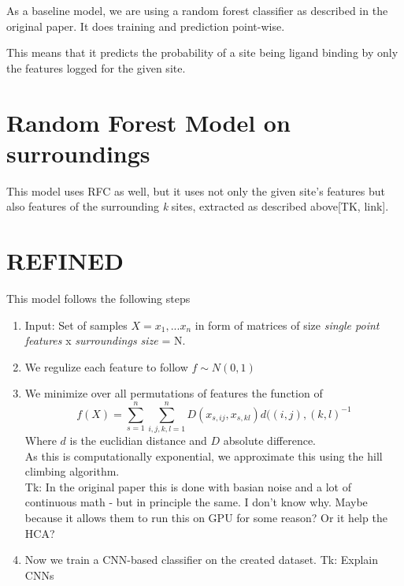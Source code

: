 As a baseline model, we are using a random forest classifier as described in the original paper. It does training and prediction point-wise.

This means that it predicts the probability of a site being ligand binding by only the features logged for the given site.


\section{Random Forest Model on surroundings}

This model uses RFC as well, but it uses not only the given site's features but also features of the surrounding \textit{k} sites, extracted as described above[TK, link].

\section{REFINED}
This model follows the following steps

\begin{enumerate}
    \item Input: Set of samples $X = x_1, ... x_n$ in form of matrices of size \textit{single point features} x \textit{surroundings size} = N.
    \item We regulize each feature to follow $f \sim N(0,1)$
    \item We minimize over all permutations of features the function of 
    $$ f(X) = \sum_{s=1}^{n} \sum_{i, j, k, l =1}^n D(x_{s, ij}, x_{s, kl}) d((i,j),(k,l)^{-1}$$
    Where $d$ is the euclidian distance and $D$ absolute difference.\\
    As this is computationally exponential, we approximate this using the hill climbing algorithm.\\
    Tk: In the original paper this is done with basian noise and a lot of continuous math - but in principle the same.
    I don't know why. Maybe because it allows them to run this on GPU for some reason? Or it help the HCA?
    \item Now we train a CNN-based classifier on the created dataset. Tk: Explain CNNs
    
\end{enumerate}


